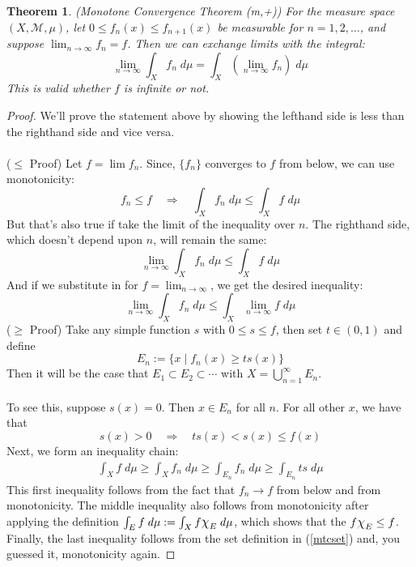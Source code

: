 \documentclass[12pt]{article}
\theoremstyle{plain}
\newtheorem{thm}{Theorem}[subsection]
\theoremstyle{definition}
\theoremstyle{remark}
\newcommand*{\Chi}{\mbox{\large$\chi$}} %
\begin{document}
\begin{thm}
\emph{(Monotone Convergence Theorem (m,+))} For the measure space $(X,\mathscr{M},\mu)$, let $0\leq f_n(x)\leq f_{n+1}(x)$ be measurable for $n=1,2,\ldots$, and suppose $\lim_{n\rightarrow\infty}f_n=f$. Then we can exchange limits with the integral:
\[
    \lim_{n\rightarrow\infty} \int_X f_n \; d\mu =
    \int_X \left(\lim_{n\rightarrow\infty} f_n\right) 
    \; d\mu 
\]
This is valid whether $f$ is infinite or not.
\end{thm}
\begin{proof} We'll prove the statement above by showing the lefthand side is less than the righthand side and vice versa.
\\
\\
($\leq$ Proof) Let $f = \lim f_n$. Since, $\{f_n\}$ converges to $f$ from below, we can use monotonicity: 
\[
    f_n \leq f \quad \Rightarrow\quad
    \int_X f_n \; d\mu \leq \int_X f\; d\mu
\]
But that's also true if take the limit of the inequality over $n$. The righthand side, which doesn't depend upon $n$, will remain the same:
\[
    \lim_{n\rightarrow\infty}
    \int_X f_n \; d\mu \leq \int_X f\; d\mu
\]
And if we substitute in for $f=\lim_{n\rightarrow\infty}$, we get the desired inequality:
\[
    \lim_{n\rightarrow\infty}
    \int_X f_n \; d\mu 
    \leq \int_X \lim_{n\rightarrow\infty}f\; d\mu
\]
($\geq$ Proof) Take any simple function $s$ with $0\leq s\leq f$, then set $t\in(0,1)$ and define
\begin{equation}
    \label{mtcset}
    E_n := \{x \; |\; f_n(x) \geq ts(x) \}
\end{equation}
Then it will be the case that $E_1\subset E_2\subset \cdots$ with $X = \bigcup^\infty_{n=1} E_n$.
\\
\\
To see this, suppose $s(x)=0$. Then $x\in E_n$ for all $n$. For all other $x$, we have that
\[
    s(x)>0\quad\Rightarrow\quad ts(x)< s(x)\leq f(x)
\]
Next, we form an inequality chain:
\begin{align}
    \label{ineqchain}
    \int_X f\;d\mu \geq \int_X f_n\;d\mu
    \geq \int_{E_n} f_n \;d\mu\geq \int_{E_n} ts \;d\mu
\end{align}
This first inequality follows from the fact that $f_n\rightarrow f$ from below and from monotonicity. The middle inequality also follows from monotonicity after applying the definition $\int_E f \; d\mu := \int_X f\Chi_E \; d\mu$, which shows that the $f\Chi_E\leq f$. Finally, the last inequality follows from the set definition in (\ref{mtcset}) and, you guessed it, monotonicity again.


\end{proof}
\end{document}
